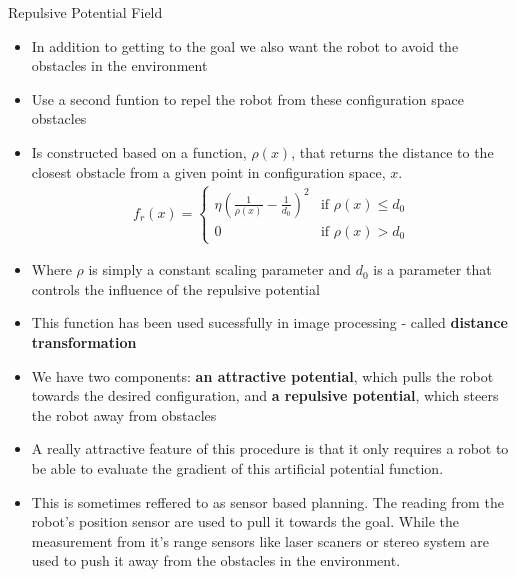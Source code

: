 \documentclass[10pt,mathserif]{beamer}
\begin{document}
\begin{frame}{Repulsive Potential Field}
\begin{itemize}
\item In addition to getting to the goal we also want the robot to avoid the obstacles in the 
environment
\item Use a second funtion to repel the robot from these configuration space obstacles
\item Is constructed based on a function, $\rho(x)$, that returns the distance to the closest obstacle
from a given point in configuration space, $x$.
\begin{align}
f_r(x) =
\left\{
	\begin{array}{ll}
		\eta(\frac{1}{\rho(x)} - \frac{1}{d_0})^2  & \mbox{if } \rho(x) \leq d_0 \\
		0 & \mbox{if } \rho(x) > d_0
	\end{array}
\right.
\end{align}
\item Where $\rho$ is simply a constant scaling parameter and $d_0$ is a parameter that controls the influence of the repulsive potential
\item This function has been used sucessfully in image processing - called \textbf{distance transformation}
\end{itemize}
\end{frame}

\begin{frame}{}
\begin{itemize}
\item We have two components: \textbf{an attractive potential}, which pulls the robot towards the
desired configuration, and \textbf{a repulsive potential}, which steers the robot away from obstacles
\item A really attractive feature of this procedure is that it only requires a robot to be able to
evaluate the gradient of this artificial potential function.
\item This is sometimes reffered to as sensor based planning. The reading from the robot's position 
sensor are used to pull it towards the goal. While the measurement from it's range sensors like laser scaners or stereo system are used to push it away from the obstacles in the environment.
\end{itemize}
\end{frame}
\end{document}
